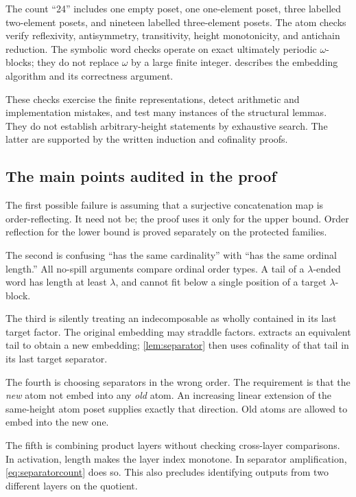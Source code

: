\documentclass[11pt,letterpaper]{article}
\theoremstyle{definition}
\theoremstyle{remark}
\begin{document}
The count ``24'' includes one empty poset, one one-element poset, three
labelled two-element posets, and nineteen labelled three-element posets.
The atom checks verify reflexivity, antisymmetry, transitivity,
height monotonicity, and antichain reduction. The symbolic word checks
operate on exact ultimately periodic $\omega$-blocks; they do not replace
$\omega$ by a large finite integer.  describes the
embedding algorithm and its correctness argument.

These checks exercise the finite representations, detect arithmetic and
implementation mistakes, and test many instances of the structural
lemmas. They do not establish arbitrary-height statements by exhaustive
search. The latter are supported by the written induction and cofinality
proofs.

\subsection{The main points audited in the proof}

The first possible failure is assuming that a surjective concatenation
map is order-reflecting. It need not be; the proof uses it only for the
upper bound. Order reflection for the lower bound is proved separately
on the protected families.

The second is confusing ``has the same cardinality'' with ``has the same
ordinal length.'' All no-spill arguments compare ordinal order types.
A tail of a $\lambda$-ended word has length at least $\lambda$, and cannot
fit below a single position of a target $\lambda$-block.

The third is silently treating an indecomposable as wholly contained in
its last target factor. The original embedding may straddle factors.
 extracts an equivalent tail to obtain a new
embedding; \cref{lem:separator} then uses cofinality of that tail in its
last target separator.

The fourth is choosing separators in the wrong order. The requirement
is that the \emph{new} atom not embed into any \emph{old} atom. An
increasing linear extension of the same-height atom poset supplies
exactly that direction. Old atoms are allowed to embed into the new one.

The fifth is combining product layers without checking cross-layer
comparisons. In activation, length makes the layer index monotone. In
separator amplification, \cref{eq:separatorcount} does so. This also
precludes identifying outputs from two different layers on the quotient.
\end{document}
